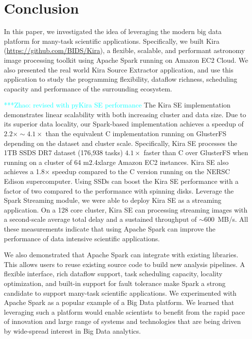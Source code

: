 \documentclass[10pt,journal,compsoc]{IEEEtran}
\newcommand{\zhaonote}[1]{{\textcolor{cyan}    { ***Zhao:      #1 }}}
\newcommand{\zhaonote}[1]{}
\begin{document}
\section{Conclusion}
\label{sec:Conclusion}

In this paper, we investigated the idea of leveraging the modern big data platform for many-task
scientific applications. Specifically, we built Kira (\url{https://github.com/BIDS/Kira}), a flexible, scalable,
and performant astronomy image processing toolkit using Apache Spark running on Amazon EC2 Cloud. We also presented
the real world Kira Source Extractor application, and use this application to study the programming
flexibility, dataflow richness, scheduling capacity and performance of the surrounding ecosystem.

\zhaonote{revised with pyKira SE performance}
The Kira SE implementation demonstrates linear scalability with both increasing cluster and data
size. Due to its superior data locality, our Spark-based implementation achieves a speedup of $2.2\times\sim4.1\times$ than the equivalent C 
implementation running on GlusterFS depending on the dataset and cluster scale. 
Specifically, Kira SE processes the 1TB SSDS DR7 dataset (176,938 tasks)
$4.1\times$ faster than C over GlusterFS when running on a cluster of 64 m2.4xlarge Amazon EC2 instances. 
Kira SE also achieves a 1.8$\times$ speedup compared to the C version running on the NERSC Edison supercomputer.  
Using SSDs can boost the Kira SE performance with a factor of two compared to the performance with spinning disks.
Leverage the Spark Streaming module, we were able to deploy Kira SE as a streaming application.
On a 128 core cluster, Kira SE can processing streaming images with a second-scale average total delay and
a sustained throughput of $\sim$600~MB/s.
All these measurements indicate that using Apache Spark can improve the performance of data intensive scientific applications.

We also demonstrated that Apache Spark can integrate with existing libraries.
This allows users to reuse existing source code to build new analysis pipelines.
A flexible interface, rich dataflow support, task scheduling capacity, locality optimization, and built-in support for fault tolerance make Spark a 
strong candidate to support many-task scientific applications. 
We experimented with Apache Spark as a popular example of a Big Data platform. We learned that
leveraging such a platform would enable scientists to benefit from the rapid pace of innovation 
and large range of systems and technologies that are being driven by wide-spread interest in Big Data analytics.
\end{document}
